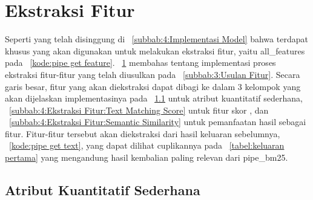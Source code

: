 \section{Ekstraksi Fitur}
\label{subbab:4:Ekstraksi Fitur}
Seperti yang telah disinggung di \subbab{}~\ref{subbab:4:Implementasi Model} bahwa terdapat \pipeline{} khusus yang akan digunakan untuk melakukan ekstraksi fitur, yaitu \pipeline{} all\_features pada \kode{}~\ref{kode:pipe get feature}. \subbab{}~\ref{subbab:4:Ekstraksi Fitur} membahas tentang implementasi proses ekstraksi fitur-fitur yang telah diusulkan pada \subbab{}~\ref{subbab:3:Usulan Fitur}. Secara garis besar, fitur yang akan diekstraksi dapat dibagi ke dalam 3 kelompok yang akan dijelaskan implementasinya pada \subbab{}~\ref{subbab:4:Ekstraksi Fitur:Atribut Kuantitatif Sederhana} untuk atribut kuantitatif sederhana, \subbab{}~\ref{subbab:4:Ekstraksi Fitur:Text Matching Score} untuk fitur skor \txt{} \matching{}, dan \subbab{}~\ref{subbab:4:Ekstraksi Fitur:Semantic Similarity} untuk pemanfaatan hasil \encoder{} sebagai fitur. Fitur-fitur tersebut akan diekstraksi dari hasil keluaran \pipeline{} sebelumnya, \kode{}~\ref{kode:pipe get text}, yang dapat dilihat cuplikannya pada \tabel{}~\ref{tabel:keluaran pertama} yang mengandung hasil kembalian paling relevan dari pipe\_bm25.
\begin{table}[H]
    \centering
    \caption{Cuplikan keluaran \pipeline{} tahap \ranking{} pertama}
    \label{tabel:keluaran pertama}
\end{table}

\subsection{Atribut Kuantitatif Sederhana}
\label{subbab:4:Ekstraksi Fitur:Atribut Kuantitatif Sederhana}

